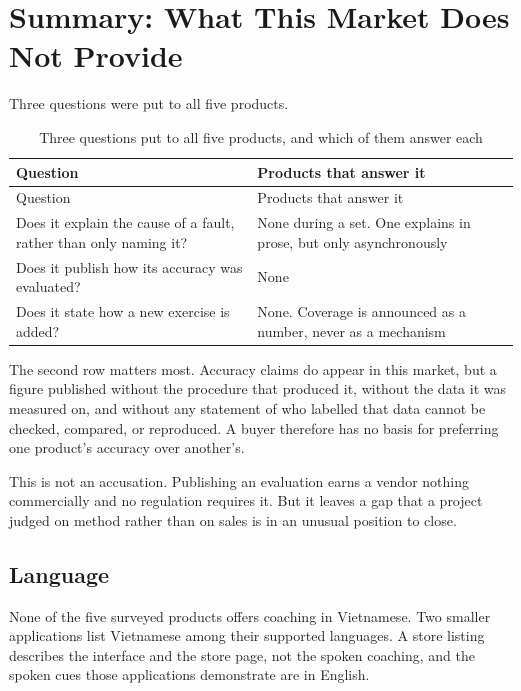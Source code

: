 \section{Summary: What This Market Does Not Provide}
\label{sec:2.4}

Three questions were put to all five products.

{\small
\setlength{\LTpre}{6pt}\setlength{\LTpost}{8pt}
\begin{longtable}{>{\raggedright\arraybackslash}p{}>{\raggedright\arraybackslash}p{}}
\caption{Three questions put to all five products, and which of them answer each}\\
\toprule
Question & Products that answer it \\
\midrule
\endfirsthead
\toprule
Question & Products that answer it \\
\midrule
\endhead
\bottomrule
\endfoot
\bottomrule
\endlastfoot
Does it explain the cause of a fault, rather than only naming it? & None during a set. One explains in prose, but only asynchronously \\
Does it publish how its accuracy was evaluated? & None \\
Does it state how a new exercise is added? & None. Coverage is announced as a number, never as a mechanism \\
\end{longtable}
}

The second row matters most. Accuracy claims do appear in this market, but a figure published without the procedure that produced it, without the data it was measured on, and without any statement of who labelled that data cannot be checked, compared, or reproduced. A buyer therefore has no basis for preferring one product's accuracy over another's.

This is not an accusation. Publishing an evaluation earns a vendor nothing commercially and no regulation requires it. But it leaves a gap that a project judged on method rather than on sales is in an unusual position to close.

\subsection{Language}
\label{sec:2.4.1}

None of the five surveyed products offers coaching in Vietnamese. Two smaller applications list Vietnamese among their supported languages. A store listing describes the interface and the store page, not the spoken coaching, and the spoken cues those applications demonstrate are in English.

